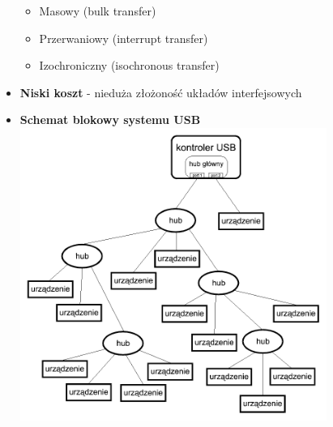 \begin{itemize}
\begin{itemize}
					\item Masowy (bulk transfer)
					\item Przerwaniowy (interrupt transfer)
					\item Izochroniczny (isochronous transfer)
				\end{itemize}
			\item \textbf{Niski koszt} - nieduża złożoność układów interfejsowych
			\item \textbf{Schemat blokowy systemu USB}\\
			\includegraphics[width=10cm]{./wyklady/USB_6_1.pdf}
		\end{itemize}
